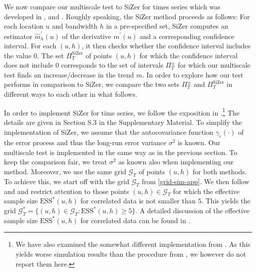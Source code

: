 We now compare our multiscale test to SiZer for times series which was developed in \cite{Rondonotti2004}, \cite{Rondonotti2007} and \cite{ParkHannigKang2009}. Roughly speaking, the SiZer method proceeds as follows: For each location $u$ and bandwidth $h$ in a pre-specified set, SiZer computes an estimator $\widehat{m}_h^\prime(u)$ of the derivative $m^\prime(u)$ and a corresponding confidence interval. For each $(u,h)$, it then checks whether the confidence interval includes the value $0$. The set $\Pi_T^{\text{SiZer}}$ of points $(u,h)$ for which the confidence interval does not include $0$ corresponds to the set of intervals $\Pi_T^\pm$ for which our multiscale test finds an increase/decrease in the trend $m$. %
In order to explore how our test performs in comparison to SiZer, we compare the two sets $\Pi_T^\pm$ and $\Pi_T^{\text{SiZer}}$ in different ways to each other in what follows. 


In order to implement SiZer for time series, we follow the exposition in \cite{ParkHannigKang2009}.\footnote{We have also examined the somewhat different implementation from \cite{Rondonotti2007}. As this yields worse simulation results than the procedure from \cite{ParkHannigKang2009}, we however do not report them here.} The details are given in Section S.3 in the Supplementary Material. To simplify the implementation of SiZer, we assume that the autocovariance function $\gamma_\varepsilon(\cdot)$ of the error process and thus the long-run error variance $\sigma^2$ is known. Our multiscale test is implemented in the same way as in the previous section. To keep the comparison fair, we treat $\sigma^2$ as known also when implementing our method. Moreover, we use the same grid $\mathcal{G}_T$ of points $(u,h)$ for both methods. To achieve this, we start off with the grid $\mathcal{G}_T$ from \eqref{grid-sim-app}. We then follow \cite{Rondonotti2007} and \cite{ParkHannigKang2009} and restrict attention to those points $(u,h) \in \mathcal{G}_T$ for which the effective sample size $\text{ESS}^*(u,h)$ for correlated data is not smaller than $5$. This yields the grid $\mathcal{G}_T^* = \{ (u, h) \in \mathcal{G}_T : \text{ESS}^*(u, h) \geq 5 \}$. A detailed discussion of the effective sample size $\text{ESS}^*(u,h)$ for correlated data can be found in \cite{Rondonotti2007}.   


